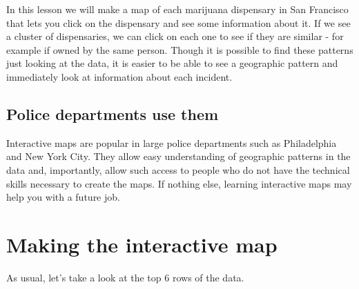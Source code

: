 \documentclass[
  12pt,
]{book}
\begin{document}
In this lesson we will make a map of each marijuana dispensary in San Francisco that lets you click on the dispensary and see some information about it. If we see a cluster of dispensaries, we can click on each one to see if they are similar - for example if owned by the same person. Though it is possible to find these patterns just looking at the data, it is easier to be able to see a geographic pattern and immediately look at information about each incident.

\hypertarget{police-departments-use-them}{%
\subsection{Police departments use them}\label{police-departments-use-them}}

Interactive maps are popular in large police departments such as Philadelphia and New York City. They allow easy understanding of geographic patterns in the data and, importantly, allow such access to people who do not have the technical skills necessary to create the maps. If nothing else, learning interactive maps may help you with a future job.

\hypertarget{making-the-interactive-map}{%
\section{Making the interactive map}\label{making-the-interactive-map}}

As usual, let's take a look at the top 6 rows of the data.
\end{document}

